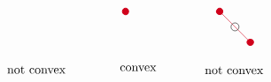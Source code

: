 \documentclass[12pt]{article}
\begin{document}
\[\begin{tikzpicture}[x=0.75pt,y=0.75pt,yscale=-1,xscale=1]
    \draw [shift={(194.67,99.12)}, rotate = 45.36] [color={rgb, 255:red, 208; green, 2; blue, 27 }  ,draw opacity=1 ][fill={rgb, 255:red, 208; green, 2; blue, 27 }  ,fill opacity=1 ][line width=0.75]      (0, 0) circle [x radius= 3.35, y radius= 3.35]   ;
    \draw [color={rgb, 255:red, 208; green, 2; blue, 27 }  ,draw opacity=1 ]   (296,99.12) -- (328.92,132.47) ;
    \draw [shift={(328.92,132.47)}, rotate = 45.36] [color={rgb, 255:red, 208; green, 2; blue, 27 }  ,draw opacity=1 ][fill={rgb, 255:red, 208; green, 2; blue, 27 }  ,fill opacity=1 ][line width=0.75]      (0, 0) circle [x radius= 3.35, y radius= 3.35]   ;
    \draw [shift={(296,99.12)}, rotate = 45.36] [color={rgb, 255:red, 208; green, 2; blue, 27 }  ,draw opacity=1 ][fill={rgb, 255:red, 208; green, 2; blue, 27 }  ,fill opacity=1 ][line width=0.75]      (0, 0) circle [x radius= 3.35, y radius= 3.35]   ;
    \draw   (308.17,115.79) .. controls (308.17,113.43) and (310.09,111.5) .. (312.46,111.5) .. controls (314.83,111.5) and (316.75,113.43) .. (316.75,115.79) .. controls (316.75,118.16) and (314.83,120.08) .. (312.46,120.08) .. controls (310.09,120.08) and (308.17,118.16) .. (308.17,115.79) -- cycle ;
    
    \draw (66,156.67) node [anchor=north west][inner sep=0.75pt]   [align=left] {not convex};
    \draw (187.33,156.67) node [anchor=north west][inner sep=0.75pt]   [align=left] {convex};
    \draw (278.67,157.33) node [anchor=north west][inner sep=0.75pt]   [align=left] {not convex};
    
    
    \end{tikzpicture}
    \]
\end{document}
